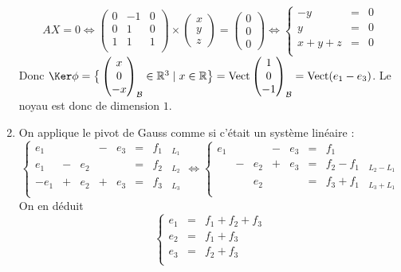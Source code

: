 \documentclass[11pt,a4paper]{article}
\newcommand{\Rr}{\mathbb{R}} \newcommand{\R}{\mathbb{R}}
\begin{document}
\begin{enumerate}
$$AX=0 \iff \begin{pmatrix}
0 & -1 & 0 \\
0 & 1  & 0 \\
1 & 1  & 1 \\  
\end{pmatrix} \times \begin{pmatrix}x\\y\\z\end{pmatrix}
=\begin{pmatrix}0\\0\\0\end{pmatrix}
\iff \left\{
\begin{array}{rcl}
-y&=&0\\
y&=&0\\
x+y+z&=&0\\
\end{array}\right.
$$
Donc $\Ker \phi = \big\{ \begin{pmatrix}x \\ 0 \\-x\end{pmatrix}_{\mathcal{B}}  \in \Rr^3 \mid x\in \Rr \big\}= 
\textrm{Vect} \begin{pmatrix}1\\0\\-1\end{pmatrix}_{\mathcal{B}} = \textrm{Vect} (e_1-e_3)$.
Le noyau est donc de dimension $1$.


  \item On applique le pivot de Gauss comme si c'était un système linéaire :
$$\left\{
\begin{array}{cccccclr}
e_1  & &     &-& e_3  &=& f_1 &_{L_1}\\
e_1  &-& e_2 & &      &=& f_2 &_{L_2}\\
-e_1 &+& e_2 &+& e_3  &=& f_3 &_{L_3}\\
\end{array}\right.
\iff  \left\{
\begin{array}{cccccclr}
e_1  & &     &-& e_3  &=& f_1 &\\
     &-& e_2 &+& e_3  &=& f_2-f_1 &_{L_2-L_1}\\
     & & e_2 & &      &=& f_3+f_1 &_{L_3+L_1}\\
\end{array}\right.
$$
On en déduit
$$\left\{
\begin{array}{rcl}
 e_1 &=& f_1+f_2+f_3 \\
 e_2 &=& f_1+f_3\\
 e_3 &=& f_2+f_3 \\
\end{array}\right.
$$


\end{enumerate}
\end{document}
